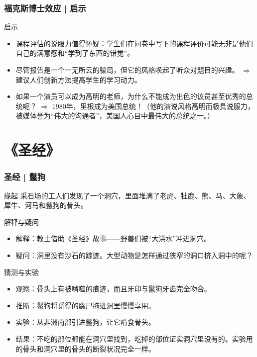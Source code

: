 \begin{frame}
  \frametitle{福克斯博士效应 | 启示}
  \begin{block}{启示}
    \begin{itemize}
      \item 课程评估的说服力值得怀疑：学生们在问卷中写下的课程评价可能无非是他们自己的满意感和“学到了东西的错觉”。
      \item 尽管报告是一个一无所云的骗局，但它的风格唤起了听众对题目的兴趣。 $\Longrightarrow$ 建议人们创新方法提高学生的学习动力。
      \item 如果一个演员可以成为高明的老师，为什么不能成为出色的议员甚至优秀的总统呢？ $\Longrightarrow$ 1980年，里根成为美国总统！（他的演说风格高明而极具说服力，被媒体誉为“伟大的沟通者”，美国人心目中最伟大的总统之一。）
    \end{itemize}
  \end{block}
\end{frame}

\section{《圣经》}
\begin{frame}
  \frametitle{圣经 | 鬣狗}
  \begin{block}{缘起}
    采石场的工人们发现了一个洞穴，里面堆满了老虎、牡鹿、熊、马、大象、犀牛、河马和鬣狗的骨头。
  \end{block}
  \vspace{-0.5em}
  \pause
  \begin{block}{解释与疑问}
    \begin{itemize}
      \item 解释：教士借助《圣经》故事——野兽们被“大洪水”冲进洞穴。
      \item 疑问：洞里没有沙石的踪迹。大型动物是怎样通过狭窄的洞口挤入洞中的呢？
    \end{itemize}
  \end{block}
  \vspace{-0.5em}
  \pause
  \begin{block}{猜测与实验}
    \begin{itemize}
      \item 观察：骨头上有被啃噬的痕迹，而且牙印与鬣狗牙齿完全吻合。
      \item 推断：鬣狗将觅得的腐尸拖进洞里慢慢享用。
      \item 实验：从非洲南部引进鬣狗，让它啃食骨头。
      \item 结果：不吃的部位都能在洞穴里找到，吃掉的部位证实洞穴里没有的。实验用的骨头和洞穴里的骨头的断裂状况完全一样。
    \end{itemize}
  \end{block}
\end{frame}

